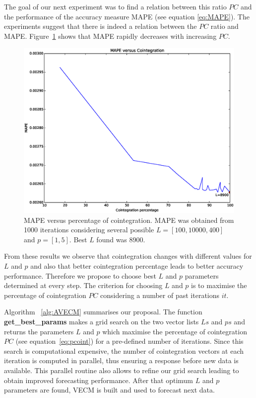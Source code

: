 The goal of our next experiment was to find a relation between this ratio
$PC$ and the performance of the accuracy measure MAPE (see equation 
\ref{eq:MAPE}). 
The experiments suggest that there is indeed a relation between the $PC$ ratio
and MAPE.
Figure~\ref{fig:cointvsmape} shows that MAPE rapidly decreases with increasing
$PC$.

\begin{figure}[!h]
  \centering
  \includegraphics[width=\textwidth]{img/MAPEvsCoint-offset21600-p-2-freq-10s}
  \caption{MAPE versus percentage of cointegration. MAPE was obtained from 1000
  iterations considering several possible $L=[100,10000,400]$ and $p=[1,5]$.
  Best $L$ found was 8900.}
  \label{fig:cointvsmape}
\end{figure}

From these results we observe that cointegration changes with different values
for $L$ and $p$ and also that better cointegration percentage leads to better
accuracy performance.
Therefore we propose to choose best $L$ and $p$ parameters determined at every
step. 
The criterion for choosing $L$ and $p$ is to maximise the percentage of
cointegration $PC$ considering a number of past iterations $it$.

Algorithm ~\ref{alg:AVECM} summarises our proposal. 
The function {\bf get\_best\_params} makes a grid search on the two vector
lists $Ls$ and $ps$ and returns the parameters $L$ and $p$ which maximise
the percentage of cointegration $PC$ (see equation~\ref{eq:pcoint}) for a
pre-defined number of iterations.
Since this search is computational expensive, the number of cointegration
vectors at each iteration is computed in parallel, thus ensuring a response
before new data is available. 
This parallel routine also allows to refine our grid search leading to obtain
improved forecasting performance.
After that optimum $L$ and $p$ parameters are found, VECM is built and used
to forecast next data.

